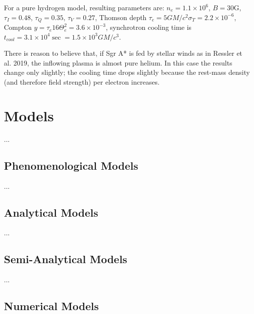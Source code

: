\documentclass[twocolumn,tighten,dvipsnames]{aastex63}
\newcommand\<{{\langle}}
\renewcommand\>{{\rangle}} %
\begin{document}
For a pure hydrogen model, resulting parameters are: $n_e = 1.1 \times 10^6$, $B = 30$G, $\tau_I = 0.48$, $\tau_Q = 0.35 $, $\tau_V = 0.27$, Thomson depth $\tau_e = 5 G M/c^2 \sigma_T = 2.2 \times 10^{-6}$, Compton $y = \tau_e 16 \Theta_e^2 = 3.6 \times 10^{-3}$, synchrotron cooling time is $t_{cool} = 3.1 \times 10^4\sec = 1.5 \times 10^3 G M/c^3$.

There is reason to believe that, if Sgr A* is fed by stellar winds as in Ressler et al. 2019, the inflowing plasma is almost pure helium.  In this case the results change only slightly; the cooling time drops slightly because the rest-mass density (and therefore field strength) per electron increases.

\section{Models}

...

\subsection{Phenomenological Models}

...

\subsection{Analytical Models}

...

\subsection{Semi-Analytical Models}

...

\subsection{Numerical Models}

\end{document}
